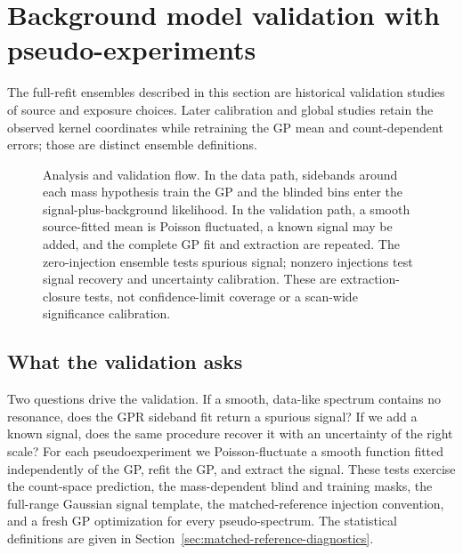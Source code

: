 
\section{Background model validation with pseudo-experiments}
\label{sec:toys}

The full-refit ensembles described in this section are historical validation
studies of source and exposure choices. Later calibration and global studies
retain the observed kernel coordinates while retraining the GP mean and
count-dependent errors; those are distinct ensemble definitions.

\begin{figure}[H]
\centering
{}
\caption{Analysis and validation flow.  In the data path, sidebands around each mass
hypothesis train the GP and the blinded bins enter the signal-plus-background
likelihood.  In the validation path, a smooth source-fitted mean is Poisson
fluctuated, a known signal may be added, and the complete GP fit and extraction are
repeated.  The zero-injection ensemble tests spurious signal; nonzero injections test
signal recovery and uncertainty calibration.  These are extraction-closure tests,
not confidence-limit coverage or a scan-wide significance calibration.}
\label{fig:v491-hps-gpr-flowchart}
\end{figure}

\subsection{What the validation asks}

Two questions drive the validation. If a smooth, data-like spectrum contains no
resonance, does the GPR sideband fit return a spurious signal? If we add a known
signal, does the same procedure recover it with an uncertainty of the right scale?
For each pseudoexperiment we Poisson-fluctuate a smooth function fitted independently
of the GP, refit the GP, and extract the signal. These tests exercise the count-space prediction,
the mass-dependent blind and training masks, the full-range Gaussian signal
template, the matched-reference injection convention, and a fresh GP optimization
for every pseudo-spectrum. The statistical definitions are given in
Section~\ref{sec:matched-reference-diagnostics}.



